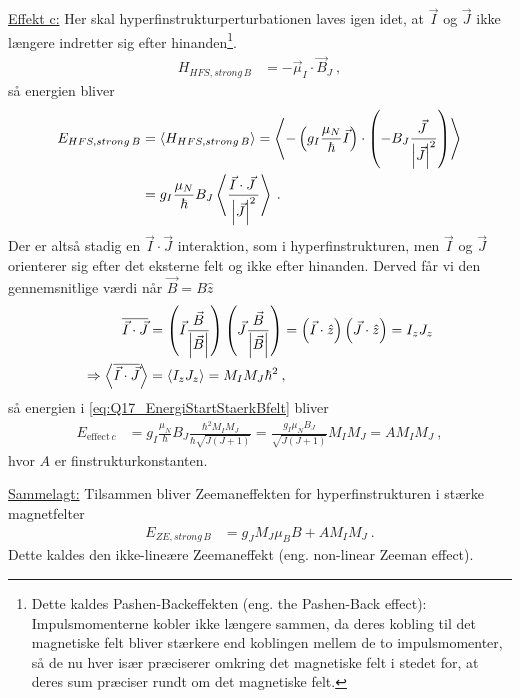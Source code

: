 \noindent\underline{Effekt c:} Her skal hyperfinstrukturperturbationen laves igen idet, at $\Vec{I}$ og $\Vec{J}$ ikke længere indretter sig efter hinanden\footnote{Dette kaldes Pashen-Backeffekten (eng. the Pashen-Back effect): Impulsmomenterne kobler ikke længere sammen, da deres kobling til det magnetiske felt bliver stærkere end koblingen mellem de to impulsmomenter, så de nu hver især præciserer omkring det magnetiske felt i stedet for, at deres sum præciser rundt om det magnetiske felt.}.
\begin{align}
    H_{HFS,strong\,B} &= - \Vec{\mu}_I \cdot \Vec{B}_J \: ,
\end{align}
så energien bliver
\begin{align} \label{eq:Q17_EnergiStartStaerkBfelt}
    E_{HFS,strong\,B} &= \Braket{H_{HFS,strong\,B}} = \Braket{- \left(g_I \frac{\mu_N}{\hbar}\Vec{I}\right) \cdot \left(- B_J\frac{\Vec{J} \:}{\abs{\Vec{J}}^2}\right)} \nonumber\\
    &= g_I \frac{\mu_N}{\hbar}B_J \Braket{\frac{\Vec{I} \cdot \Vec{J} \:}{\abs{\Vec{J}}^2}} \: .
\end{align}
Der er altså stadig en $\Vec{I} \cdot \Vec{J}$ interaktion, som i hyperfinstrukturen, men $\Vec{I}$ og $\Vec{J}$ orienterer sig efter det eksterne felt og ikke efter hinanden. Derved får vi den gennemsnitlige værdi når $\Vec{B} = B \hat{z}$
\begin{align}
    \overline{\Vec{I} \cdot \Vec{J}} &= \left(\Vec{I}\frac{\Vec{B}}{\abs{\Vec{B}}}\right)\left(\Vec{J}\frac{\Vec{B}}{\abs{\Vec{B}}}\right) = \left(\Vec{I} \cdot \hat{z}\right)\left(\Vec{J} \cdot \hat{z}\right) = I_z J_z \\
    \Rightarrow \Braket{\overline{\Vec{I} \cdot \Vec{J}}} &= \Braket{I_z J_z} = M_I M_J \hbar^2 \: ,
\end{align}
så energien i \cref{eq:Q17_EnergiStartStaerkBfelt} bliver
\begin{align} \label{eq:Q17_EnergyFromEffectC}
    E_{\text{effect}\,c} &= g_I \frac{\mu_N}{\hbar}B_J \frac{\hbar^2 M_I M_J}{\hbar \sqrt{J(J+1)}} = \frac{g_I \mu_N B_J}{\sqrt{J(J+1)}} M_I M_J = A M_I M_J \: ,
\end{align}
hvor $A$ er finstrukturkonstanten.

\noindent\underline{Sammelagt:} Tilsammen bliver Zeemaneffekten for hyperfinstrukturen i stærke magnetfelter
\begin{align} \label{eq:EnergiskiftZeemanIHyperfinstrukturStarktFelt}
    E_{ZE,strong\,B} &= g_J M_J \mu_B B + A M_I M_J \: .
\end{align}
Dette kaldes den \textsf{ikke-lineære Zeemaneffekt} (eng. non-linear Zeeman effect).


